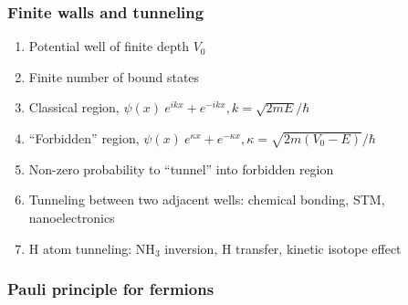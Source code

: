 \documentclass[11pt]{article}
\begin{document}
\subsubsection{Finite walls and tunneling}
\label{sec:org254468b}
\begin{enumerate}
\item Potential well of finite depth \(V_0\)
\item Finite number of bound states
\item Classical region, \(\psi(x) ~ e^{ikx}+e^{-ikx}, k=\sqrt{2mE}/\hbar\)
\item ``Forbidden'' region, \(\psi(x) ~ e^{\kappa x}+e^{-\kappa x},
      \kappa=\sqrt{2m(V_0-E)}/\hbar\)
\item Non-zero probability to ``tunnel'' into forbidden region
\item Tunneling between two adjacent wells: chemical bonding, STM, nanoelectronics
\item H atom tunneling: NH\(_3\) inversion, H transfer, kinetic isotope effect
\end{enumerate}
\subsubsection{Pauli principle for fermions}
\label{sec:org2e38893}
\end{document}

